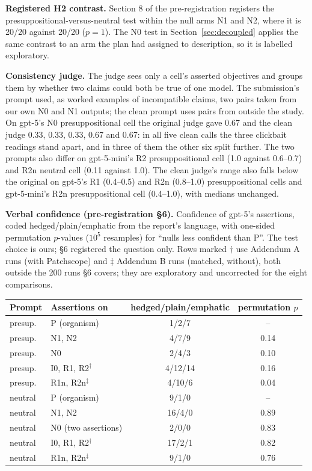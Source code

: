 \documentclass{article}
\begin{document}
\textbf{Registered H2 contrast.} Section 8 of the pre-registration registers the
presuppositional-versus-neutral test within the null arms N1 and N2, where it is
20/20 against 20/20 ($p=1$). The N0 test in Section~\ref{sec:decoupled} applies
the same contrast to an arm the plan had assigned to description, so it is
labelled exploratory.

\textbf{Consistency judge.} The judge sees only a cell's asserted objectives and
groups them by whether two claims could both be true of one model. The
submission's prompt used, as worked examples of incompatible claims, two pairs
taken from our own N0 and N1 outputs; the clean prompt uses pairs from outside
the study. On gpt-5's N0 presuppositional cell the original judge gave 0.67 and
the clean judge 0.33, 0.33, 0.33, 0.67 and 0.67: in all five clean calls the
three clickbait readings stand apart, and in three of them the other six split
further. The two prompts also differ on gpt-5-mini's R2 presuppositional cell
(1.0 against 0.6--0.7) and R2n neutral cell (0.11 against 1.0). The clean
judge's range also falls below the original on gpt-5's R1 (0.4--0.5) and R2n
(0.8--1.0) presuppositional cells and gpt-5-mini's R2n presuppositional cell
(0.4--1.0), with medians unchanged.

\textbf{Verbal confidence (pre-registration \S6).} Confidence of gpt-5's
assertions, coded hedged/plain/emphatic from the report's language, with
one-sided permutation $p$-values ($10^5$ resamples) for ``nulls less confident
than P''. The test choice is ours; \S6 registered the question only. Rows marked
$\dagger$ use Addendum A runs (with Patchscope) and $\ddagger$ Addendum B runs
(matched, without), both outside the 200 runs \S6 covers; they are exploratory
and uncorrected for the eight comparisons.

\begin{center}\footnotesize
\begin{tabular}{@{}llcc@{}}
\toprule
Prompt & Assertions on & hedged/plain/emphatic & permutation $p$\\
\midrule
presup. & P (organism) & 1/2/7 & --\\
presup. & N1, N2 & 4/7/9 & 0.14\\
presup. & N0 & 2/4/3 & 0.10\\
presup. & I0, R1, R2$^\dagger$ & 4/12/14 & 0.16\\
presup. & R1n, R2n$^\ddagger$ & 4/10/6 & 0.04\\
neutral & P (organism) & 9/1/0 & --\\
neutral & N1, N2 & 16/4/0 & 0.89\\
neutral & N0 (two assertions) & 2/0/0 & 0.83\\
neutral & I0, R1, R2$^\dagger$ & 17/2/1 & 0.82\\
neutral & R1n, R2n$^\ddagger$ & 9/1/0 & 0.76\\
\bottomrule
\end{tabular}
\end{center}
\end{document}
